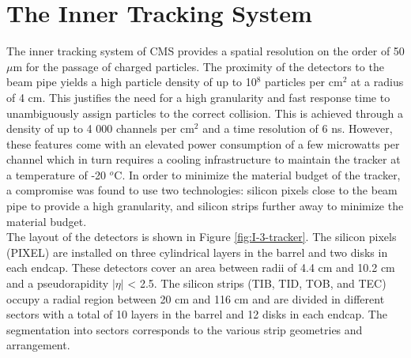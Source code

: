   \section{The Inner Tracking System}

    The inner tracking system of CMS provides a spatial resolution on the order of 50 $\mu$m for the passage of charged particles. The proximity of the detectors to the beam pipe yields a high particle density of up to 10$^8$ particles per cm$^2$ at a radius of 4 cm. This justifies the need for a high granularity and fast response time to unambiguously assign particles to the correct collision. This is achieved through a density of up to 4 000 channels per cm$^2$  and a time resolution of 6 ns. However, these features come with an elevated power consumption of a few microwatts per channel which in turn requires a cooling infrastructure to maintain the tracker at a temperature of -20 $^o$C. In order to minimize the material budget of the tracker, a compromise was found to use two technologies: silicon pixels close to the beam pipe to provide a high granularity, and silicon strips further away to minimize the material budget. \\

    The layout of the detectors is shown in Figure \ref{fig:I-3-tracker}. The silicon pixels (PIXEL) are installed on three cylindrical layers in the barrel and two disks in each endcap. These detectors cover an area between radii of 4.4 cm and 10.2 cm and a pseudorapidity $|\eta|$ < 2.5. The silicon strips (TIB, TID, TOB, and TEC) occupy a radial region between 20 cm and 116 cm and are divided in different sectors with a total of 10 layers in the barrel and 12 disks in each endcap. The segmentation into sectors corresponds to the various strip geometries and arrangement. \\


